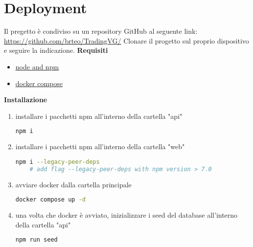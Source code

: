 \section{Deployment}
Il pregetto è condiviso su un repository GitHub al seguente link:
\newline{\\}
\noindent
\underline{\href{https://github.com/brteo/TradingVG/}{https://github.com/brteo/TradingVG/}}
\newline{\\}
\noindent
Clonare il progetto sul proprio dispositivo e seguire la indicazione.
\newline{\\}
\noindent
\textbf{Requisiti}
\begin{itemize}
	\item{\underline{\href{https://docs.npmjs.com/downloading-and-installing-node-js-and-npm}{node and npm}}}
	\item{\underline{\href{https://docs.docker.com/compose/install/}{docker compose}}}
\end{itemize}
\noindent
\textbf{Installazione}
\begin{enumerate}
	\item{installare i pacchetti npm all'interno della cartella "api"}
\begin{lstlisting}[language=bash]
	npm i
\end{lstlisting}		
	\item{installare i pacchetti npm all'interno della cartella "web"}
\begin{lstlisting}[language=bash]
	npm i --legacy-peer-deps
	# add flag --legacy-peer-deps with npm version > 7.0
\end{lstlisting}
	\item{avviare docker dalla cartella principale}
\begin{lstlisting}[language=bash]
	docker compose up -d
\end{lstlisting}
	\item{una volta che docker è avviato, inizializzare i seed del database all'interno della cartella "api"}
\begin{lstlisting}[language=bash]
	npm run seed
\end{lstlisting}
\end{enumerate}